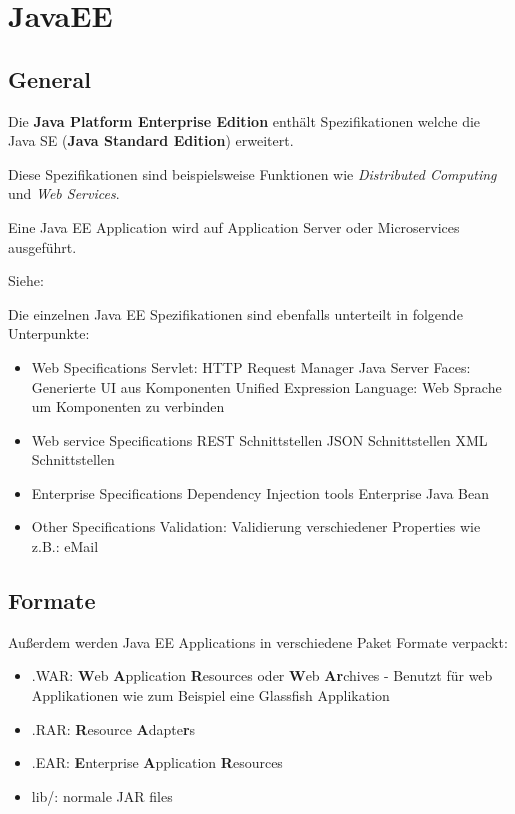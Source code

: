 
\section{JavaEE}
\subsection{General}

Die \textbf{Java Platform Enterprise Edition} enthält Spezifikationen welche die Java SE (\textbf{Java Standard Edition}) erweitert.

Diese Spezifikationen sind beispielsweise Funktionen wie \textit{Distributed Computing} und \textit{Web Services}.

Eine Java EE Application wird auf Application Server oder Microservices ausgeführt.

Siehe: \cite{wiki:javaee}


Die einzelnen Java EE Spezifikationen sind ebenfalls unterteilt in folgende Unterpunkte:

\begin{itemize}
    \item Web Specifications
        \subitem Servlet: HTTP Request Manager
        \subitem Java Server Faces: Generierte UI aus Komponenten
        \subitem Unified Expression Language: Web Sprache um Komponenten zu verbinden
    \item Web service Specifications
        \subitem REST Schnittstellen
        \subitem JSON Schnittstellen
        \subitem XML Schnittstellen
    \item Enterprise Specifications
        \subitem Dependency Injection tools
        \subitem Enterprise Java Bean
    \item Other Specifications
        \subitem Validation: Validierung verschiedener Properties wie z.B.: eMail
\end{itemize}


\subsection{Formate}

Außerdem werden Java EE Applications in verschiedene Paket Formate verpackt:

\begin{itemize}
    \item .WAR: \textbf{W}eb \textbf{A}pplication \textbf{R}esources oder \textbf{W}eb \textbf{Ar}chives - Benutzt für web Applikationen wie zum Beispiel eine Glassfish Applikation
    \item .RAR: \textbf{R}esource \textbf{A}dapte\textbf{r}s
    \item .EAR: \textbf{E}nterprise \textbf{A}pplication \textbf{R}esources
    \item lib/: normale JAR files
\end{itemize}

